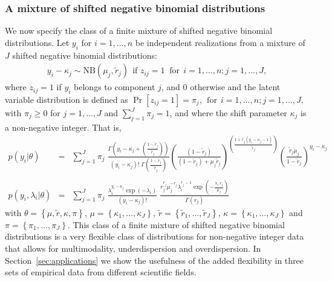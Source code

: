 \documentclass[11pt]{article}
\begin{document}






\subsubsection{A mixture of shifted negative binomial distributions}

We now specify the class of a finite
mixture of shifted negative binomial distributions.
Let $y_i$ for $i=1,\ldots,n$ be independent realizations from a mixture of $J$ shifted negative binomial distributions:
\begin{align}
\label{eq:mixtureNB1}
    y_i-\kappa_j \sim \mbox{NB}(\mu_j,\tilde r_j)\:\:\mbox{if }z_{ij}=1\;\; \mbox{for}\:\:i=1,\ldots,n;j=1,\ldots,J,
\end{align}
where $z_{ij}=1$ if $y_{i}$ belongs to component $j$, and $0$ otherwise and the latent variable distribution is defined as $\Pr[z_{ij}=1]=\pi_j, \:\:\mbox{for}\:\:i=1,\ldots,n;j=1,\ldots,J,$ 
with $\pi_j\ge0$ for $j=1,\ldots,J$ and $\sum_{j=1}^J\pi_j=1$,
and where the shift parameter $\kappa_j$ is a non-negative integer.
That is,
\begin{eqnarray}\label{eq:pyi_mixtureNB}
p(y_i|\theta) &=& \sum_{j=1}^{J} \pi_j  \;
\frac{\Gamma \left(y_i-\kappa_j+ \left( \frac{1-\tilde r_j}{\tilde r_j} \right) \right)}{(y_i-\kappa_j)! \; 
\Gamma\left( \frac{1-\tilde r_j}{\tilde r_j} \right) } \left( \frac{(1-\tilde r_j)}{(1-\tilde r_j) + \mu_j \tilde r_j} \right)^{\left( \frac{1 + \tilde r_j (y_i-\kappa_j-1)}{\tilde r_j} \right) } 
\left(\frac{\tilde r_j \mu_j}{1-\tilde r_j}\right)^{y_i-\kappa_j} \\
\nonumber \\
p(y_i, \lambda_i|\theta) &=& \sum_{j=1}^{J} \pi_j  \;
\frac{\lambda_i^{y_i-\kappa_j} \exp(-\lambda_i)}{(y_i-\kappa_j)!}  \; 
\frac{ r_j^{r_j} \mu_j^{-r_j} \lambda_i^{r_j-1} \exp \left(- \frac{\lambda_i \; r_j}{\mu_j}  \right)}{\Gamma(r_j)}
\label{eq:pyi_lambdai_mixtureNB}
\end{eqnarray}
with 
$\theta  =\left\{\mu,\tilde r,\kappa,\pi\right\}$,
$\mu    = \left\{\kappa_1,\ldots, \kappa_J\right\}$,
$\tilde r = \left\{\tilde r_1,\ldots, \tilde r_J\right\}$,
$\kappa = \left\{\kappa_1,\ldots, \kappa_J\right\}$ and
 $\pi=\left\{\pi_1,\ldots,\pi_J\right\}$.
This class of a finite mixture of shifted negative binomial distributions is a very flexible class of distributions for
non-negative integer data that allows for multimodality, underdispersion and overdispersion. In Section~\ref{sec:applications} we show the usefulness of the added flexibility in three sets of empirical data from different scientific fields.
\end{document}
